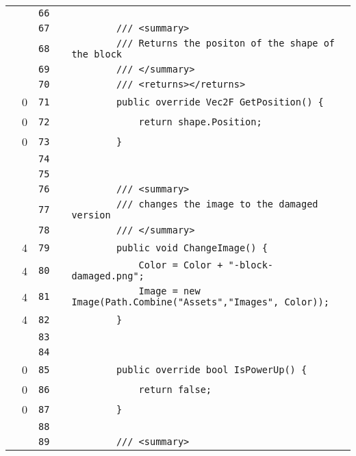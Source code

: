 \documentclass[a4paper,landscape,10pt]{article}
\begin{document}
\begin{longtable}[l]{lrrll}
\cellcolor{gray} &  & \verb~66~ & & \verb~~\\
\cellcolor{gray} &  & \verb~67~ & & \verb~        /// <summary>~\\
\cellcolor{gray} &  & \verb~68~ & & \verb~        /// Returns the positon of the shape of the block~\\
\cellcolor{gray} &  & \verb~69~ & & \verb~        /// </summary>~\\
\cellcolor{gray} &  & \verb~70~ & & \verb~        /// <returns></returns>~\\
\cellcolor{red} & 0 & \verb~71~ & & \verb~        public override Vec2F GetPosition() {~\\
\cellcolor{red} & 0 & \verb~72~ & & \verb~            return shape.Position;~\\
\cellcolor{red} & 0 & \verb~73~ & & \verb~        }~\\
\cellcolor{gray} &  & \verb~74~ & & \verb~~\\
\cellcolor{gray} &  & \verb~75~ & & \verb~~\\
\cellcolor{gray} &  & \verb~76~ & & \verb~        /// <summary>~\\
\cellcolor{gray} &  & \verb~77~ & & \verb~        /// changes the image to the damaged version~\\
\cellcolor{gray} &  & \verb~78~ & & \verb~        /// </summary>~\\
\cellcolor{green} & 4 & \verb~79~ & & \verb~        public void ChangeImage() {~\\
\cellcolor{green} & 4 & \verb~80~ & & \verb~            Color = Color + "-block-damaged.png";~\\
\cellcolor{green} & 4 & \verb~81~ & & \verb~            Image = new Image(Path.Combine("Assets","Images", Color));~\\
\cellcolor{green} & 4 & \verb~82~ & & \verb~        }~\\
\cellcolor{gray} &  & \verb~83~ & & \verb~~\\
\cellcolor{gray} &  & \verb~84~ & & \verb~~\\
\cellcolor{red} & 0 & \verb~85~ & & \verb~        public override bool IsPowerUp() {~\\
\cellcolor{red} & 0 & \verb~86~ & & \verb~            return false;~\\
\cellcolor{red} & 0 & \verb~87~ & & \verb~        }~\\
\cellcolor{gray} &  & \verb~88~ & & \verb~~\\
\cellcolor{gray} &  & \verb~89~ & & \verb~        /// <summary>~\\

\end{longtable}
\end{document}

